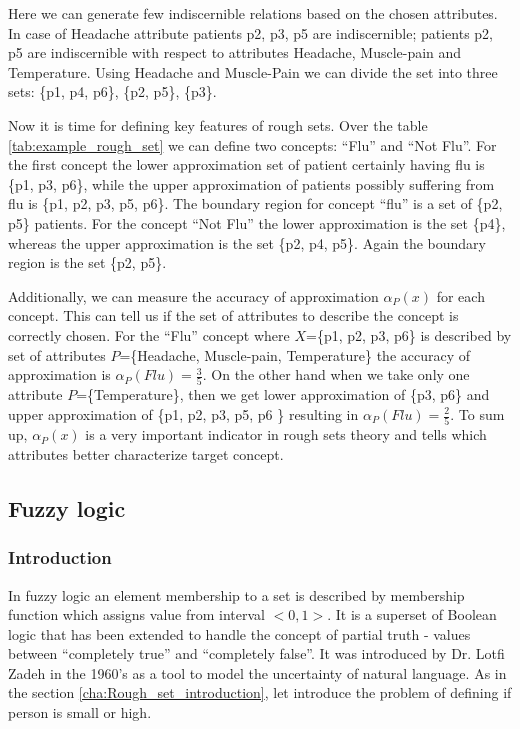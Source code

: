 Here we can generate few indiscernible relations based on 
the chosen attributes. In case of Headache attribute patients p2, p3, p5 are indiscernible; patients p2, p5 are
indiscernible with respect to attributes Headache, Muscle-pain and Temperature. 
Using Headache and Muscle-Pain we can divide the set into three sets:
\{p1, p4, p6\}, \{p2, p5\}, \{p3\}.

Now it is time for defining key features of rough sets. Over the table
\ref{tab:example_rough_set} we can define two concepts: ``Flu'' and
``Not Flu''. For the first concept the lower approximation
set of patient certainly having flu is \{p1, p3, p6\}, while the upper
approximation of patients possibly suffering from flu is \{p1, p2, p3, p5,
p6\}. The boundary region for concept ``flu'' is a set of \{p2, p5\} patients. 
For the concept ``Not Flu'' the lower approximation is the set \{p4\}, whereas
the upper approximation is the set \{p2, p4, p5\}. Again the boundary region is
the set \{p2, p5\}.

Additionally, we can measure the accuracy of approximation $\alpha_P(x)$ for each concept.
This can tell us if the set of attributes to describe the concept is correctly
chosen. For the ``Flu'' concept where $X$=\{p1, p2, p3, p6\} is described by
set of attributes $P$=\{Headache, Muscle-pain, Temperature\} the accuracy of
approximation is $\alpha_P(Flu) = \frac{3}{5}$. On the other hand when we take
only one attribute $P$=\{Temperature\}, then we get lower approximation of \{p3,
p6\} and upper approximation of \{p1, p2, p3, p5, p6 \} resulting in
$\alpha_P(Flu) = \frac{2}{5}$. To sum up, $\alpha_P(x)$ is a very important indicator in
rough sets theory and tells which attributes better characterize target
concept. 


\subsection{Fuzzy logic}
\label{cha:Fuzzy_logic}
\subsubsection{Introduction}
In fuzzy logic an element membership to a set is described by membership function 
which assigns value from interval $<0, 1>$. It is a superset of Boolean logic that 
has been extended to handle the concept of partial truth - values between ``completely 
true'' and ``completely false''. It was introduced by Dr. Lotfi Zadeh in the
1960's as a tool to model the uncertainty of natural language. As in the
section \ref{cha:Rough_set_introduction}, let introduce the problem of defining 
if person is small or high. 

